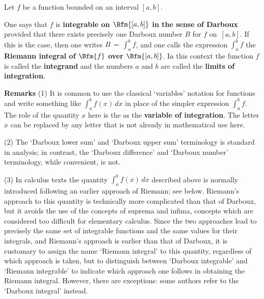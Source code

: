\V

        Let $f$ be a function bounded on an interval $[a,b]$.

\V

        One says that $f$ is {\bf integrable on $\Bfm{[a,b]}$ in the sense of Darboux}
    provided that there exists precisely one Darboux number $B$ for $f$ on~$[a,b]$.
    If this is the case, then one writes ${\displaystyle B \,=\, \int_{a}^{b} f}$, and one calls the expression
    ${\displaystyle \int_{a}^{b}} f$ the {\bf Riemann integral of $\Bfm{f}$ over $\Bfm{[a,b]}$}.
    In this context the function $f$ is called the {\bf integrand} and the numbers $a$ and $b$ are called the {\bf limits of integration}.

\V

        {\bf Remarks} (1) It is common to use the classical `variables' notation for functions and write something like ${\displaystyle \int_{a}^{b} f(x)\,dx}$
    in place of the simpler expression ${\displaystyle \int_{a}^{b} f}$. The role of the quantity $x$ here is the as the {\bf variable of integration}.
    The letter $x$ can be replaced by any letter that is not already in mathematical use here.

\V

        (2) The `Darboux lower sum' and `Darboux upper sum' terminology is standard in analysis;
    in contrast, the `Darboux difference' and `Darboux number' terminology, while convenient, is not.

\V

        (3) In calculus texts the quantity ${\displaystyle \int_{a}^{b} f(x)\,dx}$
    described above is normally introduced following an earlier approach of Riemann; see below.
    Riemann's approach to this quantity is technically more complicated than that of Darboux,
    but it avoids the use of the concepts of suprema and infima, concepts which are considered too difficult for elementary calculus.
    Since the two approaches lead to precisely the same set of integrable functions and the same values for their integrals,
    and Riemann's approach is earlier than that of Darboux, it is customary to assign the name
    `Riemann integral' to this quantity, regardless of which approach is taken, but to distinguish between `Darboux integrable' and `Riemann integrable'
    to indicate which approach one follows in obtaining the Riemann integral.
However, there are exceptions:
    some authors refer to the `Darboux integral' instead.

